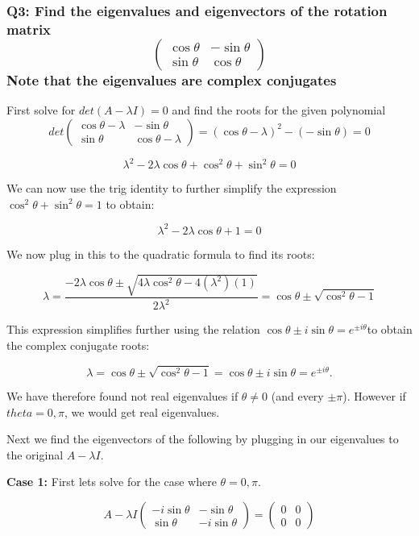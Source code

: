 \documentclass[8pt]{article}
\begin{document}
{{\subsubsection*{Q3: Find the eigenvalues and eigenvectors of the rotation matrix
$$
\begin{pmatrix}
\cos \theta & -\sin \theta \\
\sin \theta & \cos \theta
\end{pmatrix}
$$
Note that the eigenvalues are complex conjugates}

First solve for $det(A- \lambda I) = 0$ and find the roots for the given polynomial
$$
det \begin{pmatrix}
\cos \theta - \lambda & -\sin \theta \\
\sin \theta & \cos \theta - \lambda
\end{pmatrix} = (\cos \theta - \lambda)^{2} - (-\sin \theta) = 0 
$$

$$
\lambda ^{2}-2 \lambda \cos \theta + \cos ^{2} \theta + \sin ^{2} \theta = 0
$$

We can now use the trig identity to further simplify the expression $ \cos ^{2} \theta + \sin ^{2} \theta = 1$ to obtain: 

$$
\lambda ^{2}-2 \lambda \cos \theta + 1 = 0
$$

We now plug in this to the quadratic formula to find its roots:

$$
\lambda = \frac{-2 \lambda \cos \theta \pm \sqrt{4 \lambda \cos ^{2} \theta - 4(\lambda ^{2})(1)}}{2 \lambda ^{2}} = \cos \theta \pm \sqrt{\cos ^{2} \theta -1 } 
$$

This expression simplifies further using the relation $\cos \theta \pm i \sin \theta = e^{\pm i \theta}$to obtain the complex conjugate roots:

$$
\lambda = \cos \theta \pm \sqrt{\cos ^{2} \theta -1 } = \cos \theta \pm i \sin \theta = e^{\pm i \theta}.
$$

We have therefore found not real eigenvalues if $\theta \neq 0$ (and every $\pm \pi$). However if $theta = 0, \pi$, we would get real eigenvalues.

Next we find the eigenvectors of the following by plugging in our eigenvalues to the original $A- \lambda I$.

\textbf{Case 1:} First lets solve for the case where $\theta = 0, \pi$.

$$
A - \lambda I
\begin{pmatrix}
 -i \sin \theta & -\sin \theta \\
\sin \theta & -i \sin \theta 
\end{pmatrix} = 
\begin{pmatrix}
 0 & 0 \\
0 & 0 
\end{pmatrix} 
$$

}}
\end{document}
